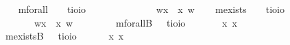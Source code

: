 \begin{isabellebody}
\isamarkuptrue%
\ \ \isamarkupfalse%
\ mforall\ \ \ {\isacharcolon}{\isacharcolon}\ {\isachardoublequoteopen}{\isacharparenleft}{\isacharprime}t{\isasymRightarrow}io{\isacharparenright}{\isasymRightarrow}io{\isachardoublequoteclose}\ {\isacharparenleft}{\isachardoublequoteopen}\isactrlbold {\isasymforall}{\isachardoublequoteclose}{\isacharparenright}\ \ \ \ \ \ \isanewline
\ \ \ \ \ {\isachardoublequoteopen}\isactrlbold {\isasymforall}{\isasymPhi}\ {\isasymequiv}\ {\isasymlambda}w{\isachardot}{\isasymforall}x{\isachardot}\ {\isacharparenleft}{\isasymPhi}\ x\ w{\isacharparenright}{\isachardoublequoteclose}\isanewline
\ \ \isamarkupfalse%
\ mexists\ \ \ {\isacharcolon}{\isacharcolon}\ {\isachardoublequoteopen}{\isacharparenleft}{\isacharprime}t{\isasymRightarrow}io{\isacharparenright}{\isasymRightarrow}io{\isachardoublequoteclose}\ {\isacharparenleft}{\isachardoublequoteopen}\isactrlbold {\isasymexists}{\isachardoublequoteclose}{\isacharparenright}\ \isanewline
\ \ \ \ \ {\isachardoublequoteopen}\isactrlbold {\isasymexists}{\isasymPhi}\ {\isasymequiv}\ {\isasymlambda}w{\isachardot}{\isasymexists}x{\isachardot}\ {\isacharparenleft}{\isasymPhi}\ x\ w{\isacharparenright}{\isachardoublequoteclose}\isanewline
\ \ \ \ \isanewline
\ \ \isamarkupfalse%
\ mforallB\ \ {\isacharcolon}{\isacharcolon}\ {\isachardoublequoteopen}{\isacharparenleft}{\isacharprime}t{\isasymRightarrow}io{\isacharparenright}{\isasymRightarrow}io{\isachardoublequoteclose}\ {\isacharparenleft}\ %
\isanewline
\ \ \ \ \ {\isachardoublequoteopen}\isactrlbold {\isasymforall}x{\isachardot}\ {\isasymphi}{\isacharparenleft}x{\isacharparenright}\ {\isasymequiv}\ \isactrlbold {\isasymforall}{\isasymphi}{\isachardoublequoteclose}\ \ \isanewline
\ \ \isamarkupfalse%
\ mexistsB\ \ {\isacharcolon}{\isacharcolon}\ {\isachardoublequoteopen}{\isacharparenleft}{\isacharprime}t{\isasymRightarrow}io{\isacharparenright}{\isasymRightarrow}io{\isachardoublequoteclose}\ {\isacharparenleft}\isanewline
\ \ \ \ \ {\isachardoublequoteopen}\isactrlbold {\isasymexists}x{\isachardot}\ {\isasymphi}{\isacharparenleft}x{\isacharparenright}\ {\isasymequiv}\ \isactrlbold {\isasymexists}{\isasymphi}{\isachardoublequoteclose}%

\end{isabellebody}
